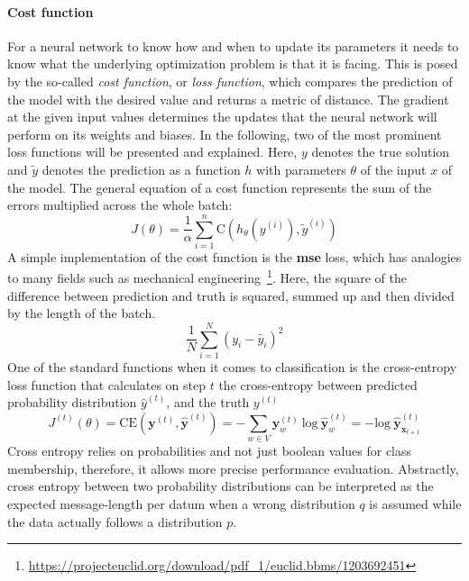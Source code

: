 \paragraph{Cost function}\label{par:cost_function}
For a neural network to know how and when to update its parameters it needs to know what the underlying optimization problem is that it is facing. This is posed by the so-called \textit{cost function}, or \textit{loss function}, which compares the prediction of the model with the desired value and returns a metric of distance. The gradient at the given input values determines the updates that the neural network will perform on its weights and biases. In the following, two of the most prominent loss functions will be presented and explained. Here, $ y $ denotes the true solution and $ \widetilde{y} $ denotes the prediction as a function $ h $ with parameters $ \theta $ of the input $ x $ of the model. The general equation of a cost function represents the sum of the errors multiplied across the whole batch:
\begin{equation}
	J(\theta) = \frac{1}{\alpha} \sum_{i=1}^{n} \text{C} (h_{\theta} (y^{(i)}), \widetilde{y}^{(i)})
\end{equation}
A simple implementation of the cost function is the \textbf{\gls{mse}} loss, which has analogies to many fields such as mechanical engineering~\footnote{\url{https://projecteuclid.org/download/pdf_1/euclid.bbms/1203692451}}. Here, the square of the difference between prediction and truth is squared, summed up and then divided by the length of the batch.
\begin{equation}
	\frac{1}{N} \sum_{i=1}^{N} \left( y_i - \widetilde{y_i} \right)^2
\end{equation}
One of the standard functions when it comes to classification is the cross-entropy loss function that calculates on step $ t $ the cross-entropy between predicted probability distribution $ \hat{y}^{(t)} $, and the truth $ y^{(t)} $
\begin{equation}
	J^{(t)}(\theta) = \text{CE}(\pmb{y}^{(t)}, \hat{\pmb{y}}^{(t)}) = - \sum_{w \in V} \pmb{y}_w^{(t)} \ \text{log} \ \hat{\pmb{y}}_w^{(t)} = - \text{log} \ \hat{\pmb{y}}_{\pmb{x}_{t+1}}^{(t)}
\end{equation}
Cross entropy relies on probabilities and not just boolean values for class membership, therefore, it allows more precise performance evaluation. Abstractly, cross entropy between two probability distributions can be interpreted as the expected message-length per datum when a wrong distribution $ q $ is assumed while the data actually follows a distribution $ p $.


